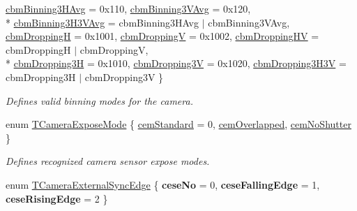 \begin{DoxyCompactItemize}
\hyperlink{group___device_specific_interface_gga915d7e18807e69567ac466541b66313ba7a8c55e348b066ad655d6d1a90c3fc2f}{cbm\+Binning3\+H\+Avg} = 0x110, 
\hyperlink{group___device_specific_interface_gga915d7e18807e69567ac466541b66313ba5d4b263e69a839b22cd33f95fa7db676}{cbm\+Binning3\+V\+Avg} = 0x120, 
\\*
\hyperlink{group___device_specific_interface_gga915d7e18807e69567ac466541b66313ba9e189a8ccc829990d7dddb80c99def0d}{cbm\+Binning3\+H3\+V\+Avg} = cbm\+Binning3\+H\+Avg $\vert$ cbm\+Binning3\+V\+Avg, 
\hyperlink{group___device_specific_interface_gga915d7e18807e69567ac466541b66313ba669f5d441ca45581ed855f8d6b8a2e41}{cbm\+Dropping\+H} = 0x1001, 
\hyperlink{group___device_specific_interface_gga915d7e18807e69567ac466541b66313ba13b2eff885f1a3cfea8a6e39f4ebaaba}{cbm\+Dropping\+V} = 0x1002, 
\hyperlink{group___device_specific_interface_gga915d7e18807e69567ac466541b66313ba3fc954a0739ba44b909da8f704f6e873}{cbm\+Dropping\+H\+V} = cbm\+Dropping\+H $\vert$ cbm\+Dropping\+V, 
\\*
\hyperlink{group___device_specific_interface_gga915d7e18807e69567ac466541b66313baa741b5365a30b0844d3cde96f7b339e7}{cbm\+Dropping3\+H} = 0x1010, 
\hyperlink{group___device_specific_interface_gga915d7e18807e69567ac466541b66313bac5c415b3b6d8e8cf50f42d1ad5aae311}{cbm\+Dropping3\+V} = 0x1020, 
\hyperlink{group___device_specific_interface_gga915d7e18807e69567ac466541b66313ba918e7d7729faf52a2f529da3fe416a40}{cbm\+Dropping3\+H3\+V} = cbm\+Dropping3\+H $\vert$ cbm\+Dropping3\+V
 \}
\begin{DoxyCompactList}\small\item\em Defines valid binning modes for the camera. \end{DoxyCompactList}\item 
enum \hyperlink{group___device_specific_interface_ga40926eaa36a3af4b5d380723be4024b9}{T\+Camera\+Expose\+Mode} \{ \hyperlink{group___device_specific_interface_gga40926eaa36a3af4b5d380723be4024b9a25972ede690fb80a009f25cce3a553de}{cem\+Standard} = 0, 
\hyperlink{group___device_specific_interface_gga40926eaa36a3af4b5d380723be4024b9affdf8bc3bfffb19274ce8adce54ceb52}{cem\+Overlapped}, 
\hyperlink{group___device_specific_interface_gga40926eaa36a3af4b5d380723be4024b9a0de6d7be571d066c30df4df4d0536b98}{cem\+No\+Shutter}
 \}
\begin{DoxyCompactList}\small\item\em Defines recognized camera sensor expose modes. \end{DoxyCompactList}\item 
\hypertarget{group___device_specific_interface_gaac8409db4152f0241d58b6b88a837fbd}{enum \hyperlink{group___device_specific_interface_gaac8409db4152f0241d58b6b88a837fbd}{T\+Camera\+External\+Sync\+Edge} \{ {\bfseries cese\+No} = 0, 
{\bfseries cese\+Falling\+Edge} = 1, 
{\bfseries cese\+Rising\+Edge} = 2
 \}}\label{group___device_specific_interface_gaac8409db4152f0241d58b6b88a837fbd}


\end{DoxyCompactItemize}
